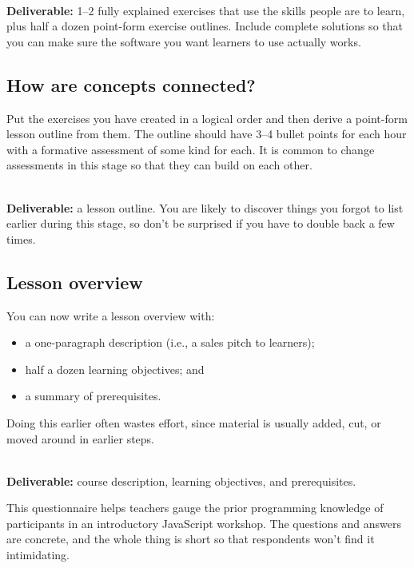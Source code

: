 ~\\
\noindent
\textbf{Deliverable:} 1--2 fully explained exercises
that use the skills people are to learn,
plus half a dozen point-form exercise outlines.
Include complete solutions
so that you can make sure the software you want learners to use actually works.

\subsection*{How are concepts connected?}

Put the exercises you have created in a logical order
and then derive a point-form lesson outline from them.
The outline should have 3--4 bullet points for each hour
with a formative assessment of some kind for each.
It is common to change assessments in this stage
so that they can build on each other.

~\\
\noindent
\textbf{Deliverable:} a lesson outline.
You are likely to discover things you forgot to list earlier during this stage,
so don't be surprised if you have to double back a few times.

\subsection*{Lesson overview}

You can now write a lesson overview with:

\begin{itemize}

\item
  a one-paragraph description (i.e., a sales pitch to learners);

\item
  half a dozen learning objectives; and

\item
  a summary of prerequisites.

\end{itemize}

Doing this earlier often wastes effort,
since material is usually added, cut, or moved around in earlier steps.

~\\
\noindent
\textbf{Deliverable:}
course description,
learning objectives,
and prerequisites.


This questionnaire helps teachers gauge the prior programming knowledge
of participants in an introductory JavaScript workshop.
The questions and answers are concrete,
and the whole thing is short so that respondents won't find it intimidating.

